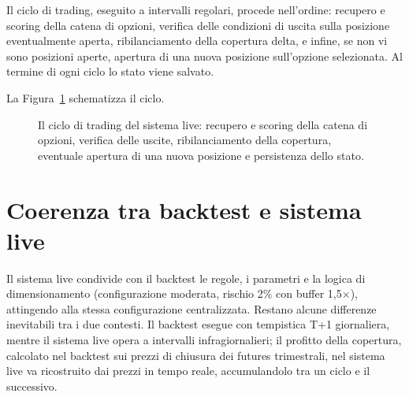 Il ciclo di trading, eseguito a intervalli regolari, procede nell'ordine:
recupero e scoring della catena di opzioni, verifica delle condizioni di
uscita sulla posizione eventualmente aperta, ribilanciamento della copertura
delta, e infine, se non vi sono posizioni aperte, apertura di una nuova
posizione sull'opzione selezionata. Al termine di ogni ciclo lo stato viene
salvato.

La Figura~\ref{fig:ciclo-live} schematizza il ciclo.

\begin{figure}[H]
\centering
{}
\caption{Il ciclo di trading del sistema live: recupero e scoring della
catena di opzioni, verifica delle uscite, ribilanciamento della copertura,
eventuale apertura di una nuova posizione e persistenza dello stato.}
\label{fig:ciclo-live}
\end{figure}

\section{Coerenza tra backtest e sistema live}
\label{sec:live-coerenza}

Il sistema live condivide con il backtest le regole, i parametri e la logica
di dimensionamento (configurazione moderata, rischio 2\% con buffer
1,5$\times$), attingendo alla stessa configurazione centralizzata. Restano
alcune differenze inevitabili tra i due contesti. Il backtest esegue con
tempistica T+1 giornaliera, mentre il sistema live opera a intervalli
infragiornalieri; il profitto della copertura, calcolato nel backtest sui
prezzi di chiusura dei futures trimestrali, nel sistema live va ricostruito
dai prezzi in tempo reale, accumulandolo tra un ciclo e il successivo.

